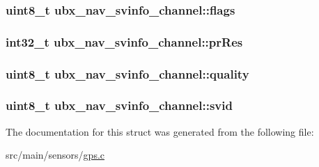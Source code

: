 \hypertarget{structubx__nav__svinfo__channel_a49a1e290e8d6c08b07b10e4ce95a8e02}{
\subsubsection[{flags}]{\setlength{\rightskip}{0pt plus 5cm}uint8\+\_\+t ubx\+\_\+nav\+\_\+svinfo\+\_\+channel\+::flags}}\label{structubx__nav__svinfo__channel_a49a1e290e8d6c08b07b10e4ce95a8e02}
\hypertarget{structubx__nav__svinfo__channel_a6dcab6073e9601fe14b0d27a7bb41b87}{
\subsubsection[{pr\+Res}]{\setlength{\rightskip}{0pt plus 5cm}int32\+\_\+t ubx\+\_\+nav\+\_\+svinfo\+\_\+channel\+::pr\+Res}}\label{structubx__nav__svinfo__channel_a6dcab6073e9601fe14b0d27a7bb41b87}
\hypertarget{structubx__nav__svinfo__channel_a09bf7b4e9746f119072e0f0beb9358bf}{
\subsubsection[{quality}]{\setlength{\rightskip}{0pt plus 5cm}uint8\+\_\+t ubx\+\_\+nav\+\_\+svinfo\+\_\+channel\+::quality}}\label{structubx__nav__svinfo__channel_a09bf7b4e9746f119072e0f0beb9358bf}
\hypertarget{structubx__nav__svinfo__channel_abae357cc8ba275f75880508f379c0255}{
\subsubsection[{svid}]{\setlength{\rightskip}{0pt plus 5cm}uint8\+\_\+t ubx\+\_\+nav\+\_\+svinfo\+\_\+channel\+::svid}}\label{structubx__nav__svinfo__channel_abae357cc8ba275f75880508f379c0255}


The documentation for this struct was generated from the following file\+:\begin{DoxyCompactItemize}
\item 
src/main/sensors/\hyperlink{gps_8c}{gps.\+c}\end{DoxyCompactItemize}
